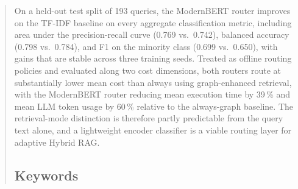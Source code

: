 \documentclass[english, bibtex]{kththesis}               %
\numberwithin{listing}{chapter}
\begin{document}
\begin{abstract}
\begin{scontents}[store-env=abstracts,print-env=true]
On a held-out test split of 193 queries, the ModernBERT router improves on the TF-IDF baseline on every aggregate classification metric, including area under the precision-recall curve (0.769 vs.\ 0.742), balanced accuracy (0.798 vs.\ 0.784), and F1 on the minority class (0.699 vs.\ 0.650), with gains that are stable across three training seeds. Treated as offline routing policies and evaluated along two cost dimensions, both routers route at substantially lower mean cost than always using graph-enhanced retrieval, with the ModernBERT router reducing mean execution time by 39\,\% and mean LLM token usage by 60\,\% relative to the always-graph baseline. The retrieval-mode distinction is therefore partly predictable from the query text alone, and a lightweight encoder classifier is a viable routing layer for adaptive Hybrid RAG.
\end{scontents}

\subsection*{Keywords}
\begin{scontents}[store-env=keywords,print-env=true]
\end{scontents}
\end{abstract}
\cleardoublepage
{}
\end{document}

